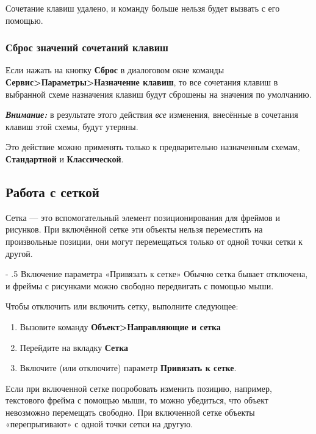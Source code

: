 ﻿\documentclass[a4paper,10pt]{article}
\makeatletter
\renewcommand\paragraph{%
   \@startsection{paragraph}{4}{0mm}%
      {-\baselineskip}%
      {.5\baselineskip}%
      {\normalfont\normalsize\bfseries}}
\makeatother
\begin{document}
 Сочетание клавиш удалено, и команду больше нельзя будет вызвать с его помощью.
 
 \subsubsection{Сброс значений сочетаний клавиш}
 Если нажать на кнопку \textbf{Сброс} в диалоговом окне команды \textbf{Сервис>Параметры>Назначение клавиш}, то все сочетания клавиш в выбранной схеме назначения клавиш будут сброшены на значения по умолчанию.
 
 \begin{mdframed}[backgroundcolor=blue!10]
\textbf{\textit{Внимание:}} в результате этого действия \textit{все} изменения, внесённые в сочетания клавиш этой схемы, будут утеряны.
\end{mdframed}
 
 Это действие можно применять только к предварительно назначенным схемам, \textbf{Стандартной} и \textbf{Классической}.
 
 \subsection{Работа с сеткой}
 Сетка — это вспомогательный элемент позиционирования для фреймов и рисунков. При включённой сетке эти объекты нельзя переместить на произвольные позиции, они могут перемещаться только от одной точки сетки к другой.
 
 \paragraph{Включение параметра «Привязать к сетке»}
 Обычно сетка бывает отключена, и фреймы с рисунками можно свободно передвигать с помощью мыши.
 
 Чтобы отключить или включить сетку, выполните следующее:
 \begin{enumerate}
  \item Вызовите команду \textbf{Объект>Направляющие и сетка}
  \item Перейдите на вкладку \textbf{Сетка}
  \item Включите (или отключите) параметр \textbf{Привязать к сетке}.
 \end{enumerate}

 Если при включенной сетке попробовать изменить позицию, например, текстового фрейма с помощью мыши, то можно убедиться, что объект невозможно перемещать свободно. При включенной сетке объекты «перепрыгивают» с одной точки сетки на другую.
 
\end{document}
